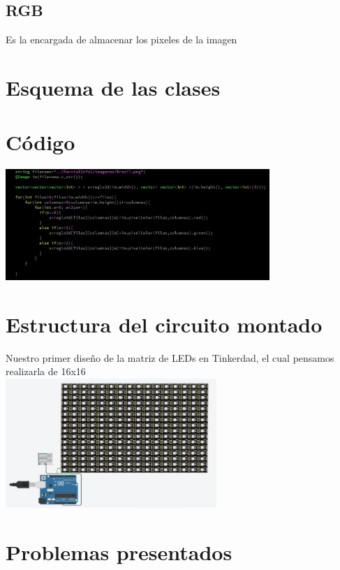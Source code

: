 \documentclass{article}
\begin{document}
\subsection{RGB}
Es la encargada de almacenar los pixeles de la imagen

\section{Esquema de las clases}

\section{Código}
\includegraphics[width=10cm]{Imagenes/Codigo_1.jpeg}


\section{Estructura del circuito montado}
Nuestro primer diseño de la matriz de LEDs en Tinkerdad, el cual pensamos realizarla de 16x16\\
\includegraphics[width=8cm]{Imagenes/circuito_2.jpeg}

\section{Problemas presentados}
\end{document}
